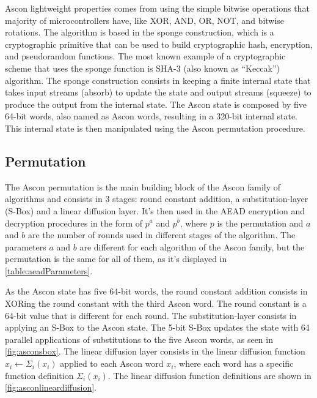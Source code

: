 \documentclass[11pt,twoside]{article}
\begin{document}
Ascon lightweight properties comes from using the simple bitwise operations that majority of microcontrollers have, like XOR, AND, OR, NOT, and bitwise rotations. The algorithm is based in the sponge construction, which is a cryptographic primitive that can be used to build cryptographic hash, encryption, and pseudorandom functions. The most known example of a cryptographic scheme that uses the sponge function is SHA-3 (also known as “Keccak”) \cite{bertoni2015keccak} algorithm. The sponge construction consists in keeping a finite internal state that takes input streams (absorb) to update the state and output streams (squeeze) to produce the output from the internal state. The Ascon state is composed by five 64-bit words, also named as Ascon words, resulting in a 320-bit internal state. This internal state is then manipulated using the Ascon permutation procedure.

\subsection{Permutation}

The Ascon permutation is the main building block of the Ascon family of algorithms and consists in 3 stages: round constant addition, a substitution-layer (S-Box) and a linear diffusion layer. It's then used in the AEAD encryption and decryption procedures in the form of $p^a$ and $p^b$, where $p$ is the permutation and $a$ and $b$ are the number of rounds used in different stages of the algorithm. The parameters $a$ and $b$ are different for each algorithm of the Ascon family, but the permutation is the same for all of them, as it's displayed in \cref{table:aeadParameters}.

As the Ascon state has five 64-bit words, the round constant addition consists in XORing the round constant with the third Ascon word. The round constant is a 64-bit value that is different for each round. The substitution-layer consists in applying an S-Box to the Ascon state. The 5-bit S-Box updates the state with 64 parallel applications of substitutions to the five Ascon words, as seen in \cref{fig:asconsbox}. The linear diffusion layer consists in the linear diffusion function $x_i \leftarrow \Sigma_i(x_i)$ applied to each Ascon word $x_i$, where each word has a specific function definition $\Sigma_i(x_i)$. The linear diffusion function definitions are shown in \cref{fig:asconlineardiffusion}.
\end{document}
